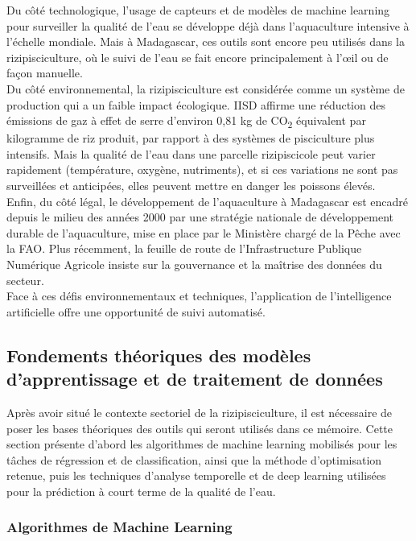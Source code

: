 \documentclass[a4paper,12pt, oneside]{article}
\begin{document}
Du côté technologique, l'usage de capteurs et de modèles de machine learning pour surveiller la qualité de l'eau se développe déjà dans l'aquaculture intensive à l'échelle mondiale. Mais à Madagascar, ces outils sont encore peu utilisés dans la rizipisciculture, où le suivi de l'eau se fait encore principalement à l'œil ou de façon manuelle.\\

Du côté environnemental, la rizipisciculture est considérée comme un système de production qui a un faible impact écologique. IISD affirme une réduction des émissions de gaz à effet de serre d'environ 0,81 kg de CO\textsubscript{2} équivalent par kilogramme de riz produit, par rapport à des systèmes de pisciculture plus intensifs. Mais la qualité de l'eau dans une parcelle rizipiscicole peut varier rapidement (température, oxygène, nutriments), et si ces variations ne sont pas surveillées et anticipées, elles peuvent mettre en danger les poissons élevés.\\

Enfin, du côté légal, le développement de l'aquaculture à Madagascar est encadré depuis le milieu des années 2000 par une stratégie nationale de développement durable de l'aquaculture, mise en place par le Ministère chargé de la Pêche avec la FAO. Plus récemment, la feuille de route de l'Infrastructure Publique Numérique Agricole insiste sur la gouvernance et la maîtrise des données du secteur.\\

Face à ces défis environnementaux et techniques, l'application de l'intelligence artificielle offre une opportunité de suivi automatisé.

\subsection{Fondements théoriques des modèles d'apprentissage et de traitement de données}

Après avoir situé le contexte sectoriel de la rizipisciculture, il est nécessaire de poser les bases théoriques des outils qui seront utilisés dans ce mémoire. Cette section présente d'abord les algorithmes de machine learning mobilisés pour les tâches de régression et de classification, ainsi que la méthode d'optimisation retenue, puis les techniques d'analyse temporelle et de deep learning utilisées pour la prédiction à court terme de la qualité de l'eau.\\

\subsubsection{Algorithmes de Machine Learning}
\end{document}
